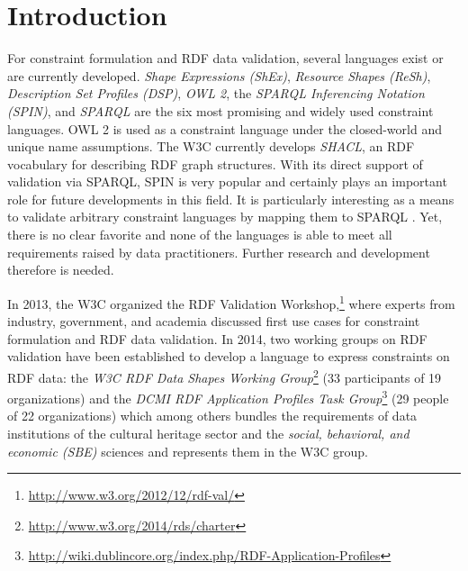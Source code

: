 \documentclass[conference]{IEEEtran}
\begin{document}
\section{Introduction}


 


For constraint formulation and RDF data validation, several languages exist or are currently developed. \emph{Shape Expressions (ShEx)}, \emph{Resource Shapes (ReSh)}, \emph{Description Set Profiles (DSP)}, \emph{OWL 2}, the \emph{SPARQL Inferencing Notation (SPIN)}, and \emph{SPARQL} are the six most promising and widely used constraint languages. OWL 2 is used as a constraint language under the closed-world and unique name assumptions. The W3C currently develops \emph{SHACL}, an RDF vocabulary for describing RDF graph structures. With its direct support of validation via SPARQL, SPIN is very popular and certainly plays an important role for future developments in this field. It is particularly interesting as a means to validate arbitrary constraint languages by mapping them to SPARQL \cite{BoschEckert2014-2}. Yet, there is no clear favorite and none of the languages is able to meet all requirements raised by data practitioners. Further research and development therefore is needed.

In 2013, the W3C organized the RDF Validation Workshop,\footnote{\url{http://www.w3.org/2012/12/rdf-val/}} 
where experts from industry, government, and academia discussed first use cases for constraint formulation and RDF data validation.
In 2014, two working groups on RDF validation have been established to develop a language to express constraints on RDF data: 
the \emph{W3C RDF Data Shapes Working Group}\footnote{\url{http://www.w3.org/2014/rds/charter}} (33 participants of 19 organizations) and the \emph{DCMI RDF Application Profiles Task Group}\footnote{\url{http://wiki.dublincore.org/index.php/RDF-Application-Profiles}} (29 people of 22 organizations) which among others bundles the requirements of data institutions of the cultural heritage sector and the \emph{social, behavioral, and economic (SBE)} sciences and represents them in the W3C group. 
\end{document}
